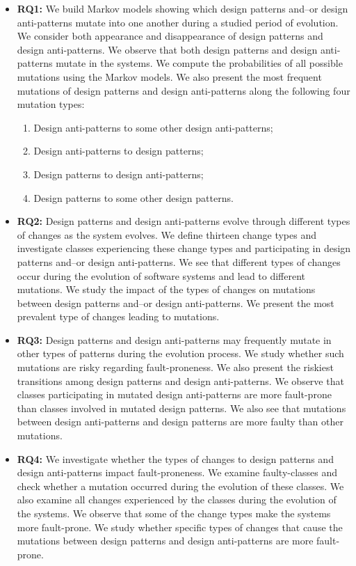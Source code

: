 \begin{itemize}
\item {\bf RQ1:} \emph{\RQOne} We build Markov models \cite{meyn2012markov} showing which design patterns and--or design anti-patterns mutate into one another during a studied period of evolution. We consider both appearance and disappearance of design patterns and design anti-patterns. We observe that both design patterns and design anti-patterns mutate in the systems. We compute the probabilities of all possible mutations using the Markov models. We also present the most frequent mutations of design patterns and design anti-patterns along the following four mutation types:

\begin{enumerate}
\item Design anti-patterns to some other design anti-patterns;
\item Design anti-patterns to design patterns;
\item Design patterns to design anti-patterns;
\item Design patterns to some other design patterns.
\end{enumerate}

\item {\bf RQ2:} \emph{\RQTwo} Design patterns and design anti-patterns evolve through different types of changes as the system evolves. We define thirteen change types and investigate classes experiencing these change types and participating in design patterns and--or design anti-patterns. We see that different types of changes occur during the evolution of software systems and lead to different mutations. We study the impact of the types of changes on mutations between design patterns and--or design anti-patterns. We present the most prevalent type of changes leading to mutations. 

\item {\bf RQ3:} \emph{\RQThree} Design patterns and design anti-patterns may frequently mutate in other types of patterns during the evolution process. We study whether such mutations are risky regarding fault-proneness. We also present the riskiest transitions among design patterns and design anti-patterns. We observe that classes participating in mutated design anti-patterns are more fault-prone than classes involved in mutated design patterns. We also see that mutations between design anti-patterns and design patterns are more faulty than other mutations. 

\item {\bf RQ4:} \emph{\RQFour} We investigate whether the types of changes to design patterns and design anti-patterns impact fault-proneness. We examine faulty-classes and check whether a mutation occurred during the evolution of these classes. We also examine all changes experienced by the classes during the evolution of the systems. We observe that some of the change types make the systems more fault-prone. We study whether specific types of changes that cause the mutations between design patterns and design anti-patterns are more fault-prone. 
\end{itemize}

